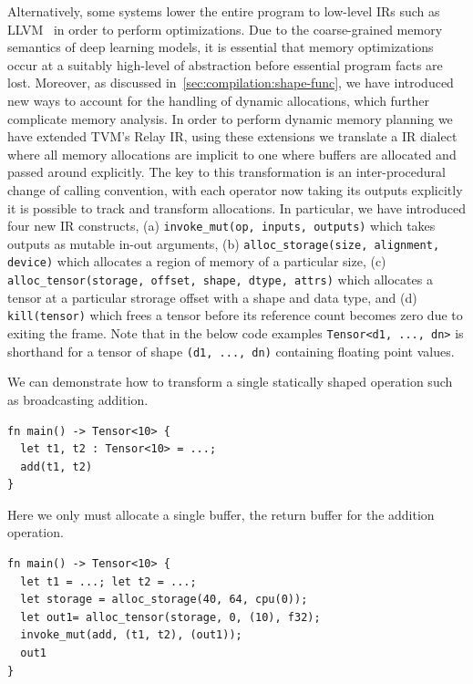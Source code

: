Alternatively, some systems lower the entire program to low-level IRs such as LLVM~\citep{llvm} in order to perform optimizations. Due to the coarse-grained memory semantics of deep learning models, it is essential that memory optimizations occur at a suitably high-level of abstraction before essential program facts are lost. Moreover, as discussed in~\autoref{sec:compilation:shape-func}, we have introduced new ways to account for the handling of dynamic allocations, which further complicate memory analysis.
In order to perform dynamic memory planning we have extended TVM's Relay IR, using these extensions we translate a IR dialect where all memory allocations are implicit to one where buffers are allocated and passed around explicitly. The key to this transformation is an inter-procedural change of calling convention, with each operator now taking its outputs explicitly it is possible to track and transform allocations.
In particular, we have introduced four new IR constructs, (a) \verb|invoke_mut(op, inputs, outputs)| which takes outputs as mutable in-out arguments, (b) \texttt{alloc\_storage(size, alignment, device)} which allocates a region of memory of a particular size, (c) \texttt{alloc\_tensor(storage, offset, shape, dtype, attrs)} which allocates a tensor at a particular strorage offset with a shape and data type, and (d) \verb|kill(tensor)| which frees a tensor before its reference count becomes zero due to exiting the frame. Note that in the below code examples \texttt{Tensor<d1, ..., dn>} is shorthand for a tensor of shape \texttt{(d1, ..., dn)} containing floating point values.

We can demonstrate how to transform a single statically shaped operation such as broadcasting addition.

\begin{lstlisting}
fn main() -> Tensor<10> {
  let t1, t2 : Tensor<10> = ...;
  add(t1, t2)
}
\end{lstlisting}

Here we only must allocate a single buffer, the return buffer for the addition operation.

\begin{lstlisting}
fn main() -> Tensor<10> {
  let t1 = ...; let t2 = ...;
  let storage = alloc_storage(40, 64, cpu(0));
  let out1= alloc_tensor(storage, 0, (10), f32);
  invoke_mut(add, (t1, t2), (out1));
  out1
}
\end{lstlisting}

